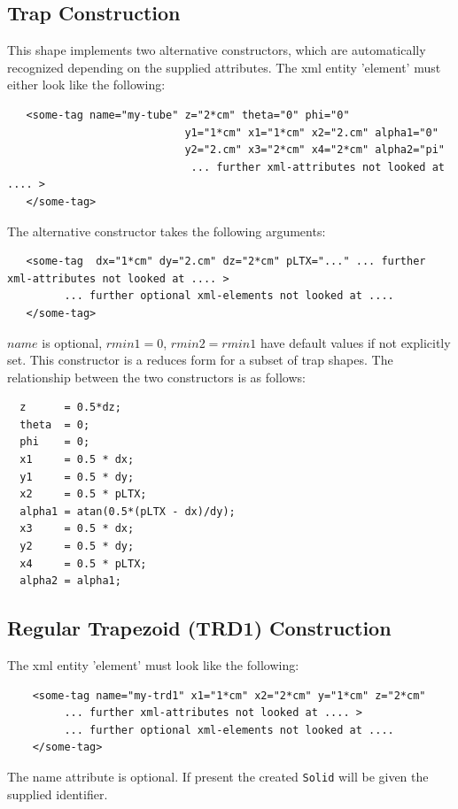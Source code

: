 \subsection{Trap Construction}
\label{sec:dd4hep-manual-plugin-trap-shape}

This shape implements two alternative constructors,
which are automatically recognized depending on the supplied attributes.
The xml entity 'element' must either look like the following:
\begin{verbatim}
   <some-tag name="my-tube" z="2*cm" theta="0" phi="0"
                            y1="1*cm" x1="1*cm" x2="2.cm" alpha1="0" 
                            y2="2.cm" x3="2*cm" x4="2*cm" alpha2="pi"
                             ... further xml-attributes not looked at .... >
   </some-tag>
\end{verbatim}
The alternative constructor takes the following arguments:
\begin{verbatim}
   <some-tag  dx="1*cm" dy="2.cm" dz="2*cm" pLTX="..." ... further xml-attributes not looked at .... >
         ... further optional xml-elements not looked at .... 
   </some-tag>
\end{verbatim}
$name$ is optional, $rmin1=0$, $rmin2=rmin1$ have default values if not explicitly set.
This constructor is a reduces form for a subset of trap shapes.
The relationship between the two constructors is as follows:
\begin{verbatim}
  z      = 0.5*dz;
  theta  = 0;
  phi    = 0;
  x1     = 0.5 * dx;
  y1     = 0.5 * dy;
  x2     = 0.5 * pLTX;
  alpha1 = atan(0.5*(pLTX - dx)/dy);
  x3     = 0.5 * dx;
  y2     = 0.5 * dy;
  x4     = 0.5 * pLTX;
  alpha2 = alpha1;
\end{verbatim}

\subsection{Regular Trapezoid (TRD1) Construction}
\label{sec:dd4hep-manual-plugin-trd1-shape}

The xml entity 'element' must look like the following:
\begin{verbatim}
    <some-tag name="my-trd1" x1="1*cm" x2="2*cm" y="1*cm" z="2*cm"
         ... further xml-attributes not looked at .... >
         ... further optional xml-elements not looked at .... 
    </some-tag>
\end{verbatim}
The name attribute is optional. If present the created \texttt{Solid} will be given the supplied identifier.

